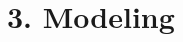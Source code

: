 \documentclass[10pt,compress,t,notes=noshow, xcolor=table]{beamer}
\begin{document}
  


\section{3. Modeling}\label{modeling-1}

    
\end{document}
